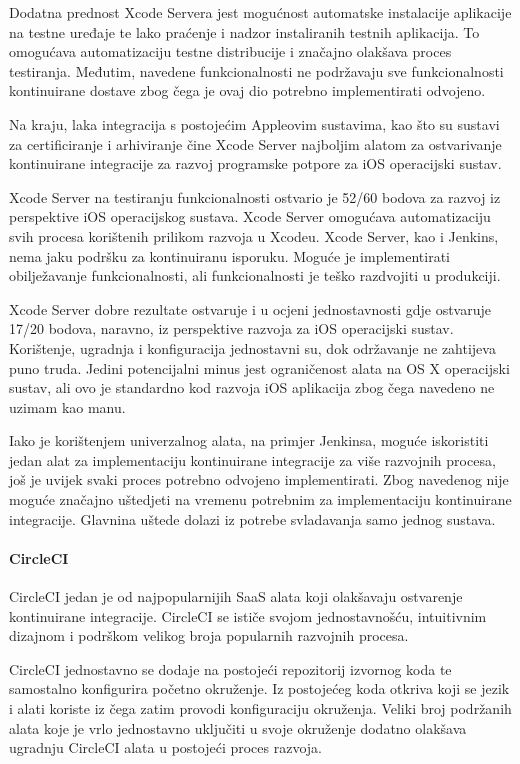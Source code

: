 \documentclass[times, utf8, diplomski, numeric]{fer}
\begin{document}
Dodatna prednost Xcode Servera jest mogućnost automatske instalacije aplikacije na testne uređaje te lako praćenje i nadzor instaliranih testnih aplikacija. To omogućava automatizaciju testne distribucije i značajno olakšava proces testiranja. Međutim, navedene funkcionalnosti ne podržavaju sve funkcionalnosti kontinuirane dostave zbog čega je ovaj dio potrebno implementirati odvojeno.

Na kraju, laka integracija s postojećim Appleovim sustavima, kao što su sustavi za certificiranje i arhiviranje čine Xcode Server najboljim alatom za ostvarivanje kontinuirane integracije za razvoj programske potpore za iOS operacijski sustav.

Xcode Server na testiranju funkcionalnosti ostvario je 52/60 bodova za razvoj iz perspektive iOS operacijskog sustava. Xcode Server omogućava automatizaciju svih procesa korištenih prilikom razvoja u Xcodeu. Xcode Server, kao i Jenkins, nema jaku podršku za kontinuiranu isporuku. Moguće je implementirati obilježavanje funkcionalnosti, ali funkcionalnosti je teško razdvojiti u produkciji.

Xcode Server dobre rezultate ostvaruje i u ocjeni jednostavnosti gdje ostvaruje 17/20 bodova, naravno, iz perspektive razvoja za iOS operacijski sustav. Korištenje, ugradnja i konfiguracija jednostavni su, dok održavanje ne zahtijeva puno truda. Jedini potencijalni minus jest ograničenost alata na OS X operacijski sustav, ali ovo je standardno kod razvoja iOS aplikacija zbog čega navedeno ne uzimam kao manu.

Iako je korištenjem univerzalnog alata, na primjer Jenkinsa, moguće iskoristiti jedan alat za implementaciju kontinuirane integracije za više razvojnih procesa, još je uvijek svaki proces potrebno odvojeno implementirati. Zbog navedenog nije moguće značajno uštedjeti na vremenu potrebnim za implementaciju kontinuirane integracije. Glavnina uštede dolazi iz potrebe svladavanja samo jednog sustava.

\paragraph{CircleCI}
CircleCI jedan je od najpopularnijih SaaS alata koji olakšavaju ostvarenje kontinuirane integracije. CircleCI se ističe svojom jednostavnošću, intuitivnim dizajnom i podrškom velikog broja popularnih razvojnih procesa.

CircleCI jednostavno se dodaje na postojeći repozitorij izvornog koda te samostalno konfigurira početno okruženje. Iz postojećeg koda otkriva koji se jezik i alati koriste iz čega zatim provodi konfiguraciju okruženja. Veliki broj podržanih alata koje je vrlo jednostavno uključiti u svoje okruženje dodatno olakšava ugradnju CircleCI alata u postojeći proces razvoja.
\end{document}
